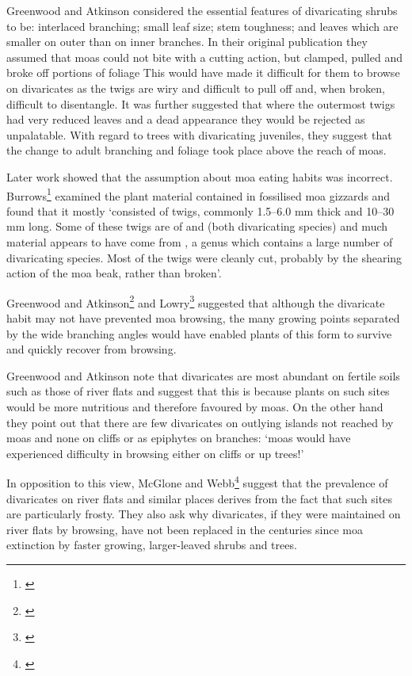 Greenwood and Atkinson considered the essential features of divaricating shrubs to be: interlaced branching; small leaf size; stem toughness; and leaves which are smaller on outer than on inner branches.
In their original publication they assumed that moas could not bite with a cutting action, but clamped, pulled and broke off portions of foliage This would have made it difficult for them to browse on divaricates as the twigs are wiry and difficult to pull off and, when broken, difficult to disentangle.
It was further suggested that where the outermost twigs had very reduced leaves and a dead appearance they would be rejected as unpalatable.
With regard to trees with divaricating juveniles, they suggest that the change to adult branching and foliage took place above the reach of moas.

Later work showed that the assumption about moa eating habits was incorrect.
Burrows\footnote{\cite{burrows1980moas}} examined the plant material contained in fossilised moa gizzards and found that it mostly `consisted of twigs, commonly 1.5–6.0 mm thick and 10–30 mm long.
Some of these twigs are of  and  (both divaricating species) and much material appears to have come from , a genus which contains a large number of divaricating species.
Most of the twigs were cleanly cut, probably by the shearing action of the moa beak, rather than broken'.

Greenwood and Atkinson\footnote{\cite{atkinson1980divaricating}} and Lowry\footnote{\cite{lowry1980evolution}} suggested that although the divaricate habit may not have prevented moa browsing, the many growing points separated by the wide branching angles would have enabled plants of this form to survive and quickly recover from browsing.

Greenwood and Atkinson note that divaricates are most abundant on fertile soils such as those of river flats and suggest that this is because plants on such sites would be more nutritious and therefore favoured by moas.
On the other hand they point out that there are few divaricates on outlying islands not reached by moas and none on cliffs or as epiphytes on branches: `moas would have experienced difficulty in browsing either on cliffs or up trees!'

In opposition to this view, McGlone and Webb\footnote{\cite{mcglone1981selective}} suggest that the prevalence of divaricates on river flats and similar places derives from the fact that such sites are particularly frosty.
They also ask why divaricates, if they were maintained on river flats by browsing, have not been replaced in the centuries since moa extinction by faster growing, larger-leaved shrubs and trees.

